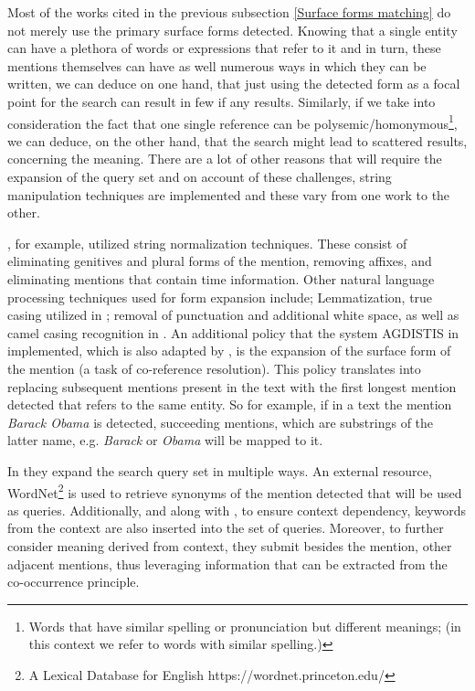 Most of the works cited in the previous subsection \ref{Surface forms matching} do not merely use the primary surface forms detected. Knowing that a single entity can have a plethora of words or expressions that refer to it and in turn, these mentions themselves can have as well numerous ways in which they can be written, we can deduce on one hand, that just using the detected form as a focal point for the search can result in few if any results. Similarly, if we take into consideration the fact that one single reference can be polysemic/homonymous\footnote{Words that have similar spelling or pronunciation but different meanings; (in this context we refer to words with similar spelling.)}, we can deduce, on the other hand, that the search might lead to scattered results, concerning the meaning.\newline
There are a lot of other reasons that will require the expansion of the query set and on account of these challenges, string manipulation techniques are implemented and these vary from one work to the other.\newline

\cite{AGDISTIS}, for example, utilized string normalization techniques. These consist of eliminating genitives and plural forms of the mention, removing affixes, and eliminating mentions that contain time information. Other natural language processing techniques used for form expansion include; Lemmatization, true casing utilized in \cite{Durrett2014}; removal of punctuation and additional white space, as well as camel casing recognition in \cite{Moussallem2017}.
An additional policy that the system AGDISTIS in \cite{AGDISTIS} implemented, which is also adapted by \cite{pershina-etal-2015-personalized}, is the expansion of the surface form of the mention (a task of co-reference resolution). This policy translates into replacing subsequent mentions present in the text with the first longest mention detected that refers to the same entity. So for example, if in a text the mention \textit{Barack Obama} is detected, succeeding mentions, which are substrings of the latter name, e.g. \textit{Barack} or \textit{Obama} will be mapped to it.\newline

In \cite{Fang2020} they expand the search query set in multiple ways. An external resource, WordNet\footnote{A Lexical Database for English https://wordnet.princeton.edu/} is used to retrieve synonyms of the mention detected that will be used as queries. Additionally, and along with \cite{Han2009NLPR}, to ensure context dependency, keywords from the context are also inserted into the set of queries. Moreover, to further consider meaning derived from context, they submit besides the mention, other adjacent mentions, thus leveraging information that can be extracted from the co-occurrence principle.\newline

